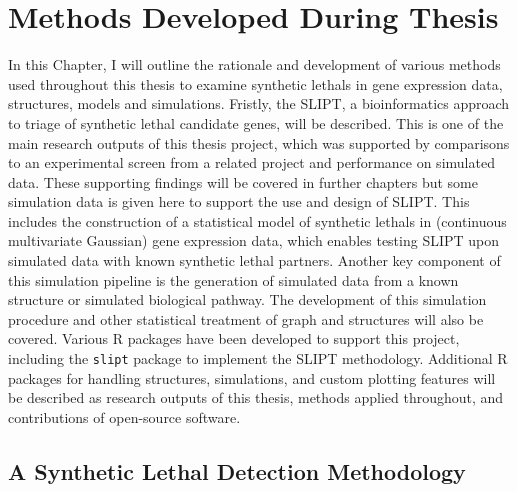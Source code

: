 \chapter{Methods Developed During Thesis}
\label{chap:methods_dev}

In this Chapter, I will outline the rationale and development of various methods used throughout this thesis to examine \glspl{synthetic lethal} in \gls{gene expression} data,  structures, models and simulations. Fristly, the \acrfull{SLIPT}, a \gls{bioinformatics} approach to triage of \gls{synthetic lethal} candidate genes, will be described. This is one of the main research outputs of this thesis project, which was supported by comparisons to an experimental screen from a related project and performance on simulated data. These supporting findings will be covered in further chapters but some simulation data is given here to support the use and design of \gls{SLIPT}. This includes the construction of a statistical model of \glspl{synthetic lethal} in (continuous multivariate Gaussian) \gls{gene expression} data, which enables testing \gls{SLIPT} upon simulated data with known \gls{synthetic lethal} partners. Another key component of this simulation pipeline is the generation of simulated data from a known  structure or simulated biological pathway. The development of this simulation procedure and other statistical \gls{treatment} of graph and  structures will also be covered. Various R packages have been developed to support this project, including the \texttt{slipt} package to implement the \gls{SLIPT} methodology. Additional R packages for handling  structures, simulations, and custom plotting features will be described as research outputs of this thesis, methods applied throughout, and contributions of open-source software.

\section{A Synthetic Lethal Detection Methodology} \label{methods:SLIPT}

